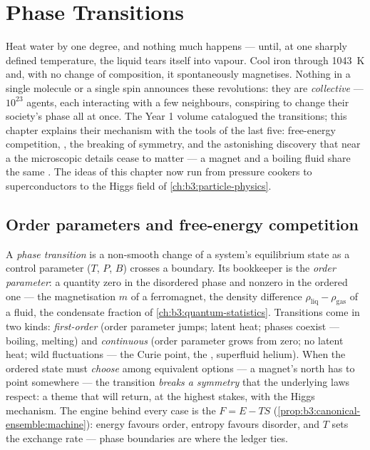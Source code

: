 \chapter{Phase Transitions}\label{ch:b3:phase-transitions}

Heat water by one degree, and nothing much happens --- until, at one
sharply defined temperature, the liquid tears itself into vapour.
Cool iron through \qty{1043}{K} and, with no change of composition,
it spontaneously magnetises. Nothing in a single molecule or a
single spin announces these revolutions: they are \emph{collective}
--- $10^{23}$ agents, each interacting with a few neighbours,
conspiring to change their society's phase all at once. The Year 1
volume catalogued the transitions; this chapter explains their
mechanism with the tools of the last five: free-energy competition,
, the breaking of symmetry, and the astonishing
discovery that near a  the microscopic details cease
to matter --- a magnet and a boiling fluid share the same . The ideas of this chapter now run from pressure cookers
to superconductors to the Higgs field of
\cref{ch:b3:particle-physics}.

\section{Order parameters and free-energy competition}

\begin{definition}\label{def:b3:phase-transitions:order}
A \emph{phase transition} is a non-smooth change of a system's
equilibrium state as a control parameter ($T$, $P$, $B$) crosses a
boundary. Its bookkeeper is the \emph{order parameter}: a quantity
zero in the disordered phase and nonzero in the ordered one --- the
magnetisation $m$ of a ferromagnet, the density difference
$\rho_{\text{liq}} - \rho_{\text{gas}}$ of a fluid, the condensate
fraction of \cref{ch:b3:quantum-statistics}. Transitions come in
two kinds: \emph{first-order} (order parameter jumps; latent heat;
phases coexist --- boiling, melting) and \emph{continuous} (order
parameter grows from zero; no latent heat; wild fluctuations ---
the Curie point, the , superfluid helium). When the
ordered state must \emph{choose} among equivalent options --- a
magnet's north has to point somewhere --- the transition
\emph{breaks a symmetry} that the underlying laws respect: a theme
that will return, at the highest stakes, with the Higgs mechanism.
The engine behind every case is the  $F = E - TS$
(\cref{prop:b3:canonical-ensemble:machine}): energy favours order,
entropy favours disorder, and $T$ sets the exchange rate --- phase
boundaries are where the ledger ties.
\end{definition}

